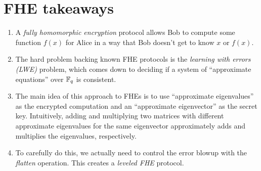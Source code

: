 \section{FHE takeaways}
\begin{tcolorbox}[takeaways]
\begin{enumerate}
\item
  A \emph{fully homomorphic encryption} protocol allows Bob to compute
  some function $f(x)$ for Alice in a way that Bob doesn't get to
  know $x$ or $f(x)$.
\item
  The hard problem backing known FHE protocols is the \emph{learning
  with errors (LWE)} problem, which comes down to deciding if a system
  of ``approximate equations'' over $\mathbb{F}_{q}$ is consistent.
\item
  The main idea of this approach to FHEs is to use ``approximate
  eigenvalues'' as the encrypted computation and an ``approximate
  eigenvector'' as the secret key. Intuitively, adding and multiplying
  two matrices with different approximate eigenvalues for the same
  eigenvector approximately adds and multiplies the eigenvalues,
  respectively.
\item
  To carefully do this, we actually need to control the error blowup
  with the \emph{flatten} operation. This creates a \emph{leveled FHE}
  protocol.
\end{enumerate}
\end{tcolorbox}
